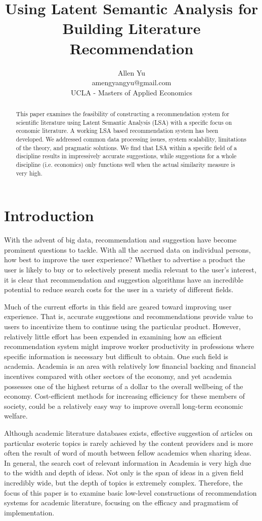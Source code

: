 \documentclass [12pt]{article}
\title{Using Latent Semantic Analysis for Building Literature Recommendation}
\author{Allen Yu \\ amengyangyu@gmail.com \\ UCLA - Masters of Applied Economics}
\begin{document}
 
\maketitle

\begin{abstract}
This paper examines the feasibility of constructing a recommendation system for scientific literature using Latent Semantic Analysis (LSA) with a specific focus on economic literature. A working LSA based recommendation system has been developed. We addressed common data processing issues, system scalability, limitations of the theory, and pragmatic solutions. We find that LSA within a specific field of a discipline results in impressively accurate suggestions, while suggestions for a whole discipline (i.e. economics) only functions well when the actual similarity measure is very high.
\end{abstract}

\section{Introduction} 
With the advent of big data, recommendation and suggestion have become prominent questions to tackle. With all the accrued data on individual persons, how best to improve the user experience? Whether to advertise a product the user is likely to buy or to selectively present media relevant to the user's interest, it is clear that recommendation and suggestion algorithms have an incredible potential to reduce search costs for the user in a variety of different fields. 

Much of the current efforts in this field are geared toward improving user experience. That is, accurate suggestions and recommendations provide value to users to incentivize them to continue using the particular product. However, relatively little effort has been expended in examining how an efficient recommendation system might improve worker productivity in professions where specific information is necessary but difficult to obtain. One such field is academia. Academia is an area with relatively low financial backing and financial incentives compared with other sectors of the economy, and yet academia possesses one of the highest returns of a dollar to the overall wellbeing of the economy. Cost-efficient methods for increasing efficiency for these members of society, could be a relatively easy way to improve overall long-term economic welfare.

Although academic literature databases exists, effective suggestion of articles on particular esoteric topics is rarely achieved by the content providers and is more often the result of word of mouth between fellow academics when sharing ideas. In general, the search cost of relevant information in Academia is very high due to the width and depth of ideas. Not only is the span of ideas in a given field incredibly wide, but the depth of topics is extremely complex. Therefore, the focus of this paper is to examine basic low-level constructions of recommendation systems for academic literature, focusing on the efficacy and pragmatism of implementation. 
\end{document}
